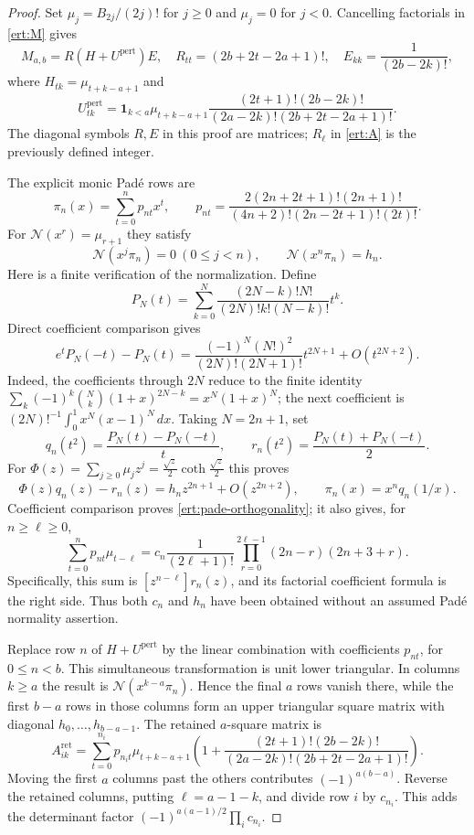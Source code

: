 \documentclass[11pt,a4paper]{article}
\numberwithin{equation}{section}
\theoremstyle{plain}
\theoremstyle{definition}
\theoremstyle{remark}
\begin{document}
\begin{proof}
Set $\mu_j=B_{2j}/(2j)!$ for $j\ge0$ and $\mu_j=0$ for $j<0$.
Cancelling factorials in \eqref{ert:M} gives
\[
 M_{a,b}=R(H+U^{\mathrm{pert}})E,
 \quad R_{tt}=(2b+2t-2a+1)!,\quad E_{kk}=\frac1{(2b-2k)!},
\]
where $H_{tk}=\mu_{t+k-a+1}$ and
\[
 U^{\mathrm{pert}}_{tk}=\mathbf1_{k<a}\mu_{t+k-a+1}
 \frac{(2t+1)!(2b-2k)!}
 {(2a-2k)!(2b+2t-2a+1)!}.
\]
The diagonal symbols $R,E$ in this proof are matrices; $R_\ell$
in \eqref{ert:A} is the previously defined integer.

The explicit monic Pad\'e rows are
\[
 \pi_n(x)=\sum_{t=0}^np_{nt}x^t,\qquad
 p_{nt}=\frac{2(2n+2t+1)!(2n+1)!}
 {(4n+2)!(2n-2t+1)!(2t)!}.
\]
For $\mathcal N(x^r)=\mu_{r+1}$ they satisfy
\begin{equation}\label{ert:pade-orthogonality}
 \mathcal N(x^j\pi_n)=0\ (0\le j<n),\qquad
 \mathcal N(x^n\pi_n)=h_n.
\end{equation}
Here is a finite verification of the normalization. Define
\[
 P_N(t)=\sum_{k=0}^N
 \frac{(2N-k)!N!}{(2N)!k!(N-k)!}t^k.
\]
Direct coefficient comparison gives
\[
 e^tP_N(-t)-P_N(t)
 =\frac{(-1)^N(N!)^2}{(2N)!(2N+1)!}t^{2N+1}
       +O(t^{2N+2}).
\]
Indeed, the coefficients through $2N$ reduce to the finite identity
$\sum_k(-1)^k\binom Nk(1+x)^{2N-k}=x^N(1+x)^N$;
the next coefficient is
$(2N)!^{-1}\int_0^1x^N(x-1)^N\,dx$.
Taking $N=2n+1$, set
\[
 q_n(t^2)=\frac{P_N(t)-P_N(-t)}t,\qquad
 r_n(t^2)=\frac{P_N(t)+P_N(-t)}2.
\]
For $\Phi(z)=\sum_{j\ge0}\mu_jz^j
=\frac{\sqrt z}{2}\coth\frac{\sqrt z}{2}$ this proves
\[
 \Phi(z)q_n(z)-r_n(z)=h_nz^{2n+1}+O(z^{2n+2}),
 \qquad \pi_n(x)=x^nq_n(1/x).
\]
Coefficient comparison proves \eqref{ert:pade-orthogonality};
it also gives, for $n\ge\ell\ge0$,
\begin{equation}\label{ert:constant-pade-row}
 \sum_{t=0}^np_{nt}\mu_{t-\ell}=c_n
 \frac1{(2\ell+1)!}
 \prod_{r=0}^{2\ell-1}(2n-r)(2n+3+r).
\end{equation}
Specifically, this sum is $[z^{n-\ell}]r_n(z)$, and its
factorial coefficient formula is the right side. Thus both
$c_n$ and $h_n$ have been obtained without an assumed Pad\'e
normality assertion.

Replace row $n$ of $H+U^{\mathrm{pert}}$ by the linear combination
with coefficients $p_{nt}$, for $0\le n<b$. This simultaneous
transformation is unit lower triangular. In columns $k\ge a$ the
result is $\mathcal N(x^{k-a}\pi_n)$. Hence the final $a$ rows
vanish there, while the first $b-a$ rows in those columns form an
upper triangular square matrix with diagonal
$h_0,\ldots,h_{b-a-1}$. The retained $a$-square matrix is
\[
 A^{\mathrm{ret}}_{ik}=
 \sum_{t=0}^{n_i}p_{n_it}\mu_{t+k-a+1}
 \left(1+\frac{(2t+1)!(2b-2k)!}
 {(2a-2k)!(2b+2t-2a+1)!}\right).
\]
Moving the first $a$ columns past the others contributes
$(-1)^{a(b-a)}$. Reverse the retained columns, putting
$\ell=a-1-k$, and divide row $i$ by $c_{n_i}$.
This adds the determinant factor
$(-1)^{a(a-1)/2}\prod_i c_{n_i}$.


\end{proof}
\end{document}
